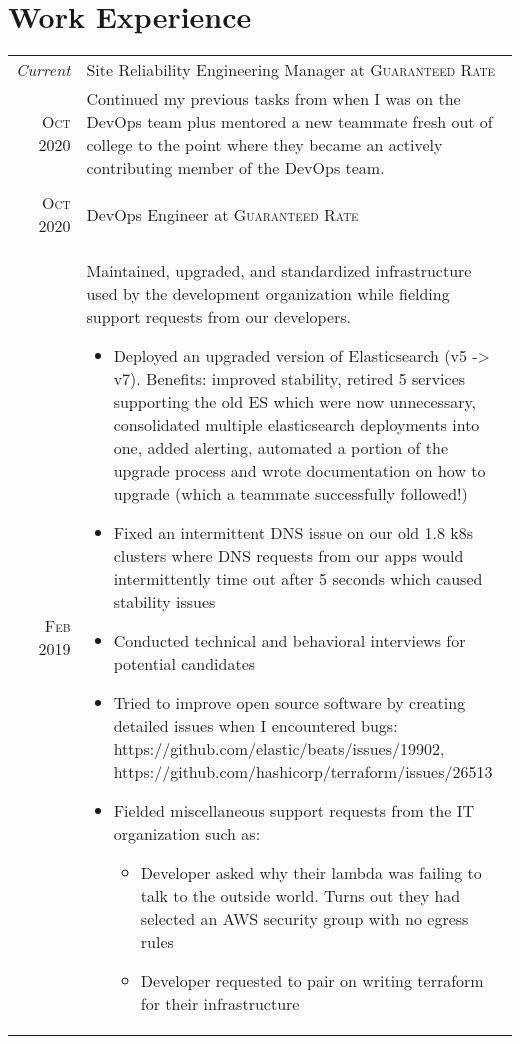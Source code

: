 \documentclass[a4paper,10pt]{article}
\begin{document}
\section{Work Experience}
\begin{tabular}{r|p{13cm}}
 \emph{Current} & Site Reliability Engineering Manager at \textsc{Guaranteed Rate} \\
 \textsc{Oct 2020} &
 \footnotesize{Continued my previous tasks from when I was on the DevOps team plus mentored a new teammate fresh out of college to the point where they became an actively contributing member of the DevOps team.}
 \\
 \multicolumn{2}{c}{} \\
 \textsc{Oct 2020} & DevOps Engineer at \textsc{Guaranteed Rate} \\
 \textsc{Feb 2019} &
 \footnotesize{Maintained, upgraded, and standardized infrastructure used by the development organization while fielding support requests from our developers.}
 \begin{itemize}
 \item \footnotesize{Deployed an upgraded version of Elasticsearch (v5 -> v7). Benefits: improved stability, retired 5 services supporting the old ES which were now unnecessary, consolidated multiple elasticsearch deployments into one, added alerting, automated a portion of the upgrade process and wrote documentation on how to upgrade (which a teammate successfully followed!)}
 \item \footnotesize{Fixed an intermittent DNS issue on our old 1.8 k8s clusters where DNS requests from our apps would intermittently time out after 5 seconds which caused stability issues}
 \item \footnotesize{Conducted technical and behavioral interviews for potential candidates}
 \item \footnotesize{Tried to improve open source software by creating detailed issues when I encountered bugs: https://github.com/elastic/beats/issues/19902, https://github.com/hashicorp/terraform/issues/26513}
 \item \footnotesize{Fielded miscellaneous support requests from the IT organization such as:}
   \begin{itemize}
   \item \footnotesize{Developer asked why their lambda was failing to talk to the outside world. Turns out they had selected an AWS security group with no egress rules}
   \item \footnotesize{Developer requested to pair on writing terraform for their infrastructure}

\end{itemize}
\end{itemize}
\end{tabular}
\end{document}
